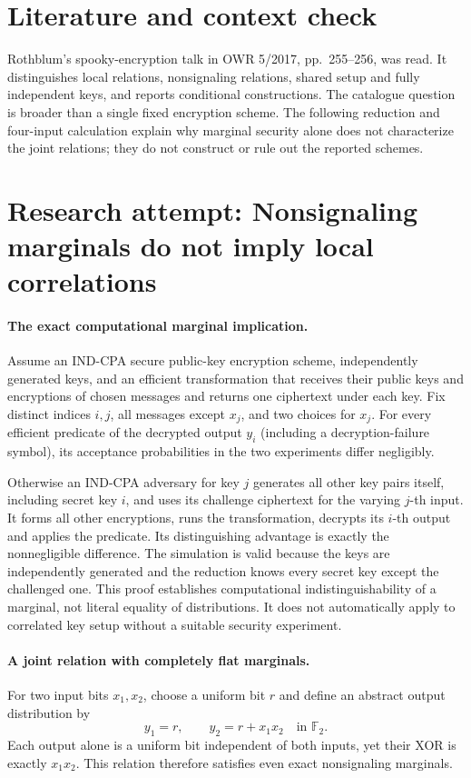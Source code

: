 \documentclass[11pt]{article}
\begin{document}
\section{Literature and context check}
Rothblum's spooky-encryption talk in OWR 5/2017, pp.~255--256, was read. It distinguishes local relations, nonsignaling relations, shared setup and fully independent keys, and reports conditional constructions. The catalogue question is broader than a single fixed encryption scheme. The following reduction and four-input calculation explain why marginal security alone does not characterize the joint relations; they do not construct or rule out the reported schemes.
\section{Research attempt: Nonsignaling marginals do not imply local correlations}

\paragraph{The exact computational marginal implication.}
Assume an IND-CPA secure public-key encryption scheme, independently generated keys, and an efficient transformation that receives their public keys and encryptions of chosen messages and returns one ciphertext under each key. Fix distinct indices $i,j$, all messages except $x_j$, and two choices for $x_j$. For every efficient predicate of the decrypted output $y_i$ (including a decryption-failure symbol), its acceptance probabilities in the two experiments differ negligibly.

Otherwise an IND-CPA adversary for key $j$ generates all other key pairs itself, including secret key $i$, and uses its challenge ciphertext for the varying $j$-th input. It forms all other encryptions, runs the transformation, decrypts its $i$-th output and applies the predicate. Its distinguishing advantage is exactly the nonnegligible difference. The simulation is valid because the keys are independently generated and the reduction knows every secret key except the challenged one. This proof establishes computational indistinguishability of a marginal, not literal equality of distributions. It does not automatically apply to correlated key setup without a suitable security experiment.

\paragraph{A joint relation with completely flat marginals.}
For two input bits $x_1,x_2$, choose a uniform bit $r$ and define an abstract output distribution by
\[
 y_1=r,\qquad y_2=r+x_1x_2\quad\text{in }\mathbb F_2.
\]
Each output alone is a uniform bit independent of both inputs, yet their XOR is exactly $x_1x_2$. This relation therefore satisfies even exact nonsignaling marginals.
\end{document}

